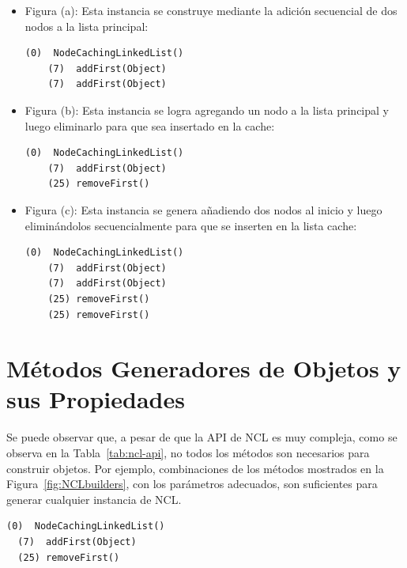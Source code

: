 \begin{itemize}
\item Figura (a): Esta instancia se construye mediante la adición secuencial de dos nodos a la lista principal:
\vspace{5pt} 
    \begin{lstlisting}[numbers=none,label=fig:NCLbuilders_a,xleftmargin=0pt]
    (0)  NodeCachingLinkedList()
    (7)  addFirst(Object)
    (7)  addFirst(Object)
    \end{lstlisting}

\item Figura (b):  
    Esta instancia se logra agregando un nodo a la lista principal y luego eliminarlo para que sea insertado en la cache:
    \vspace{5pt} 

    \begin{lstlisting}[numbers=none,label=fig:NCLbuilders_b, xleftmargin=0pt]
    (0)  NodeCachingLinkedList()
    (7)  addFirst(Object)
    (25) removeFirst()
    \end{lstlisting}

\item Figura (c): 
    Esta instancia se genera añadiendo dos nodos al inicio y luego eliminándolos secuencialmente para que se inserten en la lista cache:
    \vspace{5pt} 

    \begin{lstlisting}[numbers=none,label=fig:NCLbuilders_c, xleftmargin=0pt]
    (0)  NodeCachingLinkedList()
    (7)  addFirst(Object)
    (7)  addFirst(Object)  
    (25) removeFirst()
    (25) removeFirst()
    \end{lstlisting}

\end{itemize}



\section{Métodos Generadores de Objetos y sus Propiedades}

Se puede observar que, a pesar de que la API de NCL es muy compleja, como se observa en la Tabla~\ref{tab:ncl-api}, no todos los métodos son necesarios para construir objetos. 
Por ejemplo, combinaciones de los métodos mostrados en la Figura~\ref{fig:NCLbuilders}, con los parámetros adecuados, son suficientes para generar cualquier instancia de NCL.
\vspace{5pt} 
\begin{lstlisting}[numbers=none,label=fig:NCLbuilders, caption=Conjunto de métodos generadores de objetos para NCL]
  (0)  NodeCachingLinkedList()
  (7)  addFirst(Object)
  (25) removeFirst()
\end{lstlisting}


